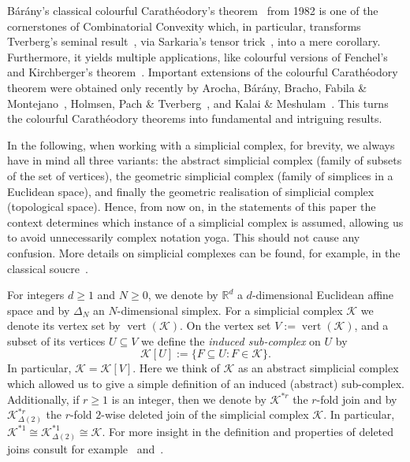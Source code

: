 \documentclass[a4paper,11pt,reqno, english]{amsart}
\theoremstyle{definition}
\theoremstyle{remark}
\newcommand\R{\mathbb R}
\newcommand\K{\mathscr{K}}
\DeclareMathOperator{\vertex}{\mathrm{vert}}
\begin{document}
%
%
B\'ar\'any's classical colourful Carath\'eodory's theorem~\cite{Barany1982} from 1982 is one of the cornerstones of Combinatorial Convexity which, in particular, transforms Tverberg's seminal result~\cite{Tverberg1966}, via Sarkaria's tensor trick~\cite{Sarkaria1992}, into a mere corollary.
Furthermore, it yields multiple applications, like colourful versions of Fenchel's and Kirchberger's theorem~\cite{Barany2021}.
Important extensions of the colourful Carath\'eodory theorem were obtained only recently by Arocha, B\'ar\'any, Bracho, Fabila \& Montejano~\cite{ArochaBaranyBrachoFabilaMontejano2009}, Holmsen, Pach \& Tverberg~\cite{HolmsenPachTverberg2008}, and Kalai \& Meshulam~\cite{KalaiMeshulam2005}.
This turns the colourful Carath\'eodory theorems into fundamental and intriguing results.




\medskip
In the following, when working with a simplicial complex, for brevity, we always have in mind all three variants: the abstract simplicial complex (family of subsets of the set of vertices), the geometric simplicial complex (family of simplices in a Euclidean space), and finally the geometric realisation of simplicial complex (topological space).
Hence, from now on, in the statements of this paper the context determines which instance of a simplicial complex is assumed, allowing us to avoid unnecessarily complex notation yoga.
This should not cause any confusion.
More details on simplicial complexes can be found, for example, in the classical soucre~\cite{Munkres1984}.


\medskip
For integers $d\geq 1$ and $N\geq 0$, we denote by $\R^d$ a $d$-dimensional Euclidean affine space and by $\Delta_N$ an $N$-dimensional simplex.
For a simplicial complex $\K$ we denote its vertex set by $\vertex (\K)$.
On the vertex set $V:=\vertex(\K)$, and a subset of its vertices $U\subseteq V$ we define the {\em induced sub-complex} on $U$ by
\[
	\K[U]:=\{ F\subseteq U : F\in\K\}.
\]
In particular, $\K=\K[V]$.
Here we think of $\K$ as an abstract simplicial complex which allowed us to give a simple definition of an induced (abstract) sub-complex.
Additionally, if $r\geq 1$ is an integer, then we denote by $\K^{*r}$ the $r$-fold join and by $\K^{*r}_{\Delta(2)}$ the $r$-fold $2$-wise deleted join of the simplicial complex  $\K$.
In particular, $\K^{*1}\cong \K^{*1}_{\Delta(2)}\cong \K$.
For more insight in the definition and properties of deleted joins consult for example~\cite[Sec.\,6.3]{Matousek2008} and~\cite[Sec,\,3.2.2]{BlagojevicZiegler2017}.
\end{document}
